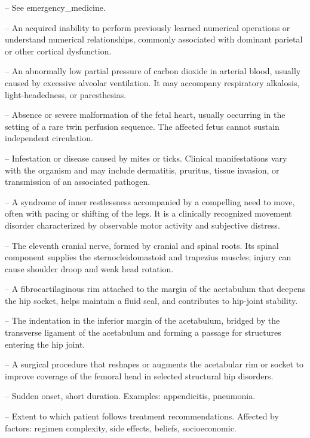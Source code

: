-- See emergency\_medicine.

-- An acquired inability to perform previously learned numerical operations or understand numerical relationships, commonly associated with dominant parietal or other cortical dysfunction.

-- An abnormally low partial pressure of carbon dioxide in arterial blood, usually caused by excessive alveolar ventilation. It may accompany respiratory alkalosis, light-headedness, or paresthesias.

-- Absence or severe malformation of the fetal heart, usually occurring in the setting of a rare twin perfusion sequence. The affected fetus cannot sustain independent circulation.

-- Infestation or disease caused by mites or ticks. Clinical manifestations vary with the organism and may include dermatitis, pruritus, tissue invasion, or transmission of an associated pathogen.

-- A syndrome of inner restlessness accompanied by a compelling need to move, often with pacing or shifting of the legs. It is a clinically recognized movement disorder characterized by observable motor activity and subjective distress.

-- The eleventh cranial nerve, formed by cranial and spinal roots. Its spinal component supplies the sternocleidomastoid and trapezius muscles; injury can cause shoulder droop and weak head rotation.

-- A fibrocartilaginous rim attached to the margin of the acetabulum that deepens the hip socket, helps maintain a fluid seal, and contributes to hip-joint stability.

-- The indentation in the inferior margin of the acetabulum, bridged by the transverse ligament of the acetabulum and forming a passage for structures entering the hip joint.

-- A surgical procedure that reshapes or augments the acetabular rim or socket to improve coverage of the femoral head in selected structural hip disorders.

-- Sudden onset, short duration. Examples: appendicitis, pneumonia.

-- Extent to which patient follows treatment recommendations. Affected by factors: regimen complexity, side effects, beliefs, socioeconomic.


